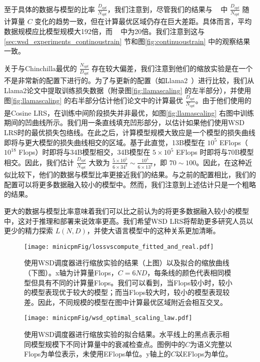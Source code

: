 至于具体的数据与模型的比率 $\frac{D_{opt}}{N_{opt}}$，我们注意到，尽管我们的结果与 ~\cite{hoffmann2022training} 中 $\frac{D_{opt}}{N_{opt}}$ 随计算量 $C$ 变化的趋势一致，但在计算最优区域仍存在巨大差距。具体而言，平均数据规模应比模型规模大192倍，而 ~\cite{hoffmann2022training} 中为20倍。我们注意到这与\ref{sec:wsd_experiments_continoustrain} 节和图\ref{fig:continuoustrain} 中的观察结果一致。

关于与Chinchilla最优的 $\frac{N_{opt}}{D_{opt}}$ 存在较大偏差，我们注意到他们的缩放实验是在一个不是非常新的配置下进行的。为了与更新的配置（如Llama2~\citep{touvron2023llama}）进行比较，我们从Llama2论文中提取训练损失数据（附录图\ref{fig:llamascaling} 的左半部分），并使用图\ref{fig:llamascaling} 的右半部分估计他们论文中的计算最优 $\frac{D_{opt}}{N_{opt}}$。由于他们使用的是Cosine LRS，在训练中间阶段损失并非最优，如图\ref{fig:llamascaling} 右图中训练期间的凹曲线所示。我们用一条直线填充凹形部分，以估计如果他们使用WSD LRS时的最优损失包络线。在此之后，计算模型规模大致应是一个模型的损失曲线即将与更大模型的损失曲线相交的区域。基于此直觉，13B模型在 $10^5$ EFlops（$10^{18}$ Flops）时即将与34B模型相交，34B模型在 $5\times 10^5$ EFlops 时即将与70B模型相交。因此，我们估计 $\frac{D_{opt}}{N_{opt}}$ 大致为 $\frac{5\times 10^5}{6\times 34^2} \sim \frac{10^5}{6\times 13^2} $，即 $70 \sim 100$。因此，在这种近似比较下，他们的数据与模型比率更接近我们的结果。与之前的配置相比，我们的配置可以将更多数据融入较小的模型中。然而，我们注意到上述估计只是一个粗略的结果。 

更大的数据与模型比率意味着我们可以比之前认为的将更多数据融入较小的模型中，这对于推理和部署来说效率更高。我们希望WSD LRS将帮助更多研究人员以更少的精力探索 $L(N, D)$，并使大语言模型中的这种关系更加清晰。 


\begin{figure}[!t]
    \centering
    \texttt{[image: minicpmFig/lossvscompute\_fitted\_and\_real.pdf]}
    \caption{使用WSD调度器进行缩放实验的结果（上图）以及拟合的缩放曲线（下图）。x轴为计算量Flops，$C = 6ND$，每条线的颜色代表相同模型但具有不同的计算量Flops。我们可以看到，当Flops较小时，较小的模型表现优于较大的模型；而当Flops较大时，较小的模型表现较差。因此，不同规模的模型在图中计算最优区域附近会相互交叉。}
    \label{fig:wsd_optimalscalinglaw}
\end{figure}

\begin{figure}[!t]
    \centering
    \texttt{[image: minicpmFig/wsd\_optimal\_scaling\_law.pdf]}
    \caption{使用WSD调度器进行缩放实验的拟合结果。水平线上的黑点表示相同模型规模下不同计算量中的衰减检查点。图例中的$C$为语义完整以Flops为单位表示，未使用EFlops单位。y轴上的$C$以EFlops为单位。}
    \label{fig:wsd_optimalscalinglaw}
\end{figure}



